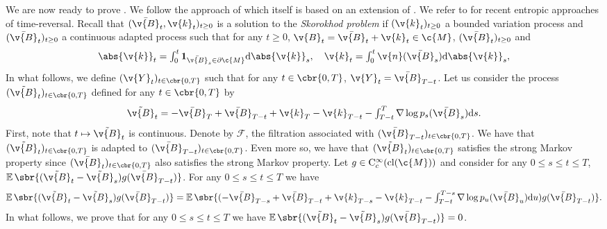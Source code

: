 We are now ready to prove .
We follow the approach of \cite{petit1997Time} which itself is based on an extension of \cite{haussmann1986time}.
We refer to \textcite{cattiaux2021time} for recent entropic approaches of time-reversal.
Recall that $(\bar{\v{B}}_t, \v{k}_t)_{t \geq 0}$ is a solution to the \emph{Skorokhod problem} \parencite{skorokhod1961stochastic} if $(\v{k}_t)_{t \geq 0}$ a bounded variation process and $(\bar{\v{B}}_t)_{t \geq 0}$ a continuous adapted process such that for any $t \geq 0$, $\v{B}_t = \bar{\v{B}}_t + \v{k}_t \in \c{M}$, $(\bar{\v{B}}_t)_{t \geq 0}$ and \begin{equation} \label{eq:skorokhod_app} \textstyle{\abs{\v{k}}_t = \int_0^t \mathbf{1}_{\bar{\v{B}}_s \in \partial \c{M}} \mathrm{d} \abs{\v{k}}_s , \quad \v{k}_t = \int_0^t \v{n}(\bar{\v{B}}_s) \mathrm{d} \abs{\v{k}}_s ,} \end{equation} In what follows, we define $(\v{Y}_t)_{t \in \cbr{0,T}}$ such that for any $t \in \cbr{0,T}$, $\v{Y}_t = \bar{\v{B}}_{T-t}$.
Let us consider the process $(\tilde{\v{B}}_t)_{t \in \cbr{0,T}}$ defined for any $t \in \cbr{0,T}$ by \begin{equation} \textstyle{\tilde{\v{B}}_t = -\bar{\v{B}}_T + \bar{\v{B}}_{T-t} + \v{k}_T - \v{k}_{T-t} - \int_{T-t}^T \nabla \log p_s(\bar{\v{B}}_s) \mathrm{d} s .
	}
\end{equation}
First, note that $t \mapsto \tilde{\v{B}}_t$ is continuous.
Denote by $\mathcal{F}$, the filtration associated with $(\bar{\v{B}}_{T-t})_{t \in \cbr{0,T}}$.
We have that $(\tilde{\v{B}}_t)_{t \in \cbr{0,T}}$ is adapted to $(\bar{\v{B}}_{T-t})_{t \in \cbr{0,T}}$.
Even more so, we have that $(\tilde{\v{B}}_t)_{t \in \cbr{0,T}}$ satisfies the strong Markov property since $(\bar{\v{B}}_t)_{t \in \cbr{0,T}}$ also satisfies the strong Markov property.
Let $g \in \mathrm{C}_c^\infty(\mathrm{cl}(\c{M}))$ and consider for any $0 \leq s \leq t \leq T$, $\E\sbr{(\tilde{\v{B}}_t - \tilde{\v{B}}_s)g(\bar{\v{B}}_{T-t})}$.
For any $0 \leq s \leq t \leq T$ we have \begin{equation} \label{eq:first_equality} \E\sbr{(\tilde{\v{B}}_t - \tilde{\v{B}}_s)g(\bar{\v{B}}_{T-t})} = \textstyle{\E\sbr{(-\bar{\v{B}}_{T-s} + \bar{\v{B}}_{T-t} + \v{k}_{T-s} - \v{k}_{T-t} - \int_{T-t}^{T-s} \nabla \log p_u(\bar{\v{B}}_u) \mathrm{d} u) g(\bar{\v{B}}_{T-t})} .
	}
\end{equation}
In what follows, we prove that for any $0 \leq s \leq t \leq T$ we have $\E\sbr{(\tilde{\v{B}}_t - \tilde{\v{B}}_s)g(\bar{\v{B}}_{T-t})} = 0$.
